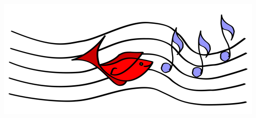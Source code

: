 \documentclass[a4paper,11pt,poets,durations]{ConcProg}
\begin{document}
\begin{center}
\includegraphics[scale=2]{logo.png}
\end{center}
\end{document}
